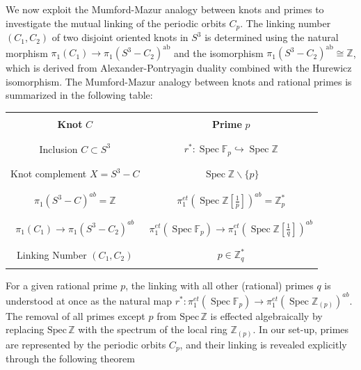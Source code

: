 \documentclass[letterpaper,11pt]{article}
\theoremstyle{plain}
\begin{document}
We now exploit the Mumford-Mazur analogy between knots and primes to investigate the mutual linking of the periodic orbits $ C_p$.  
The linking number $ \left(C_1, C_2\right)$ of two disjoint oriented knots in  $S^3$ is determined using the natural morphism $\pi_1(C_1) \to \pi_1(S^3 - C_2)^{\text{ab}}$ and the isomorphism $\pi_1(S^3 - C_2)^{\text{ab}} \cong \mathbb{Z}$, which is derived from Alexander-Pontryagin duality combined with the Hurewicz isomorphism.  
The Mumford-Mazur analogy between knots and rational primes is summarized in the following table:

\begin{center}
\renewcommand{\arraystretch}{0.5}
 \begin{tabular}{c | c}
& \\ \textbf{Knot} $C$ & \textbf{Prime} $p$ \\
& \\
\hline 
& \\ Inclusion $C \subset S^3$ & $r^*: \operatorname{Spec} \mathbb{F}_p \hookrightarrow \operatorname{Spec} \mathbb{Z}$ \\ & \\
& \\ Knot complement $X=S^3-C$ & $\operatorname{Spec} \mathbb{Z} \backslash\{p\}$ \\ & \\
& \\$\pi_1\left(S^3-C\right)^{a b}=\mathbb{Z}$ & $\pi_1^{e t}(\operatorname{Spec} \mathbb{Z}[\frac 1p])^{a b}=\mathbb{Z}_p^*$ \\
& \\
& \\ $\pi_1\left(C_1\right) \rightarrow \pi_1\left(S^3-C_2\right)^{a b}$ & $\pi_1^{e t}\left(\operatorname{Spec} \mathbb{F}_p\right) \rightarrow \pi_1^{e t}(\operatorname{Spec} \mathbb{Z}[\frac 1q])^{a b}$ \\
& \\
& \\ Linking Number $\left(C_1, C_2\right)$ & $p \in \mathbb{Z}_q^*$ \\
& \\
\end{tabular}\end{center}




For a given rational prime $ p $, the linking with all other (rational) primes $ q $ is understood at once as the natural map $r^*:\pi_1^{e t}\left(\operatorname{Spec} \mathbb{F}_p\right) \rightarrow \pi_1^{e t}(\operatorname{Spec} \mathbb{Z}_{(p)})^{a b}$. The removal of all primes except $ p $ from $ \text{Spec} \, \mathbb{Z} $ is effected algebraically by replacing $ \text{Spec} \, \mathbb{Z} $ with the spectrum of the local ring $ \mathbb{Z}_{(p)} $. In our set-up, primes are represented by the periodic orbits $ C_p $, and their linking is revealed explicitly through the following theorem
\end{document}

